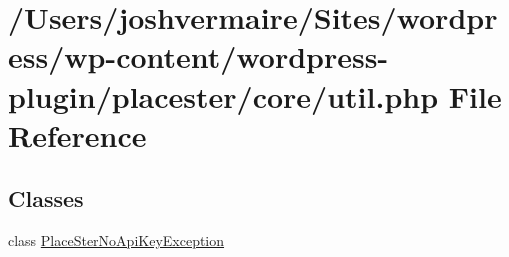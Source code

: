 \hypertarget{util_8php}{
\section{/Users/joshvermaire/Sites/wordpress/wp-\/content/wordpress-\/plugin/placester/core/util.php File Reference}
\label{d1/dda/util_8php}
}
\subsection*{Classes}
\begin{DoxyCompactItemize}
\item 
class \hyperlink{class_place_ster_no_api_key_exception}{PlaceSterNoApiKeyException}
\end{DoxyCompactItemize}
